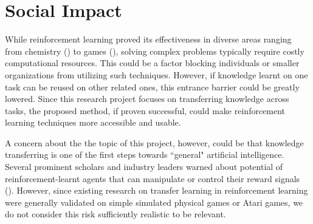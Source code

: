 \section{Social Impact}

While reinforcement learning proved its effectiveness in diverse areas ranging from chemistry (\cite{zhou2017optimizing}) to games (\cite{silver2017mastering}), solving complex problems typically require costly computational resources. This could be a factor blocking individuals or smaller organizations from utilizing such techniques. However, if knowledge learnt on one task can be reused on other related ones, this entrance barrier could be greatly lowered. Since this research project focuses on transferring knowledge across tasks, the proposed method, if proven successful, could make reinforcement learning techniques more accessible and usable.

A concern about the the topic of this project, however, could be that knowledge transferring is one of the first steps towards ``general" artificial intelligence. Several prominent scholars and industry leaders warned about potential of reinforcement-learnt agents that can manipulate or control their reward signals (\cite{russell2016research}). However, since existing research on transfer learning in reinforcement learning were generally validated on simple simulated physical games or Atari games, we do not consider this risk sufficiently realistic to be relevant. 


